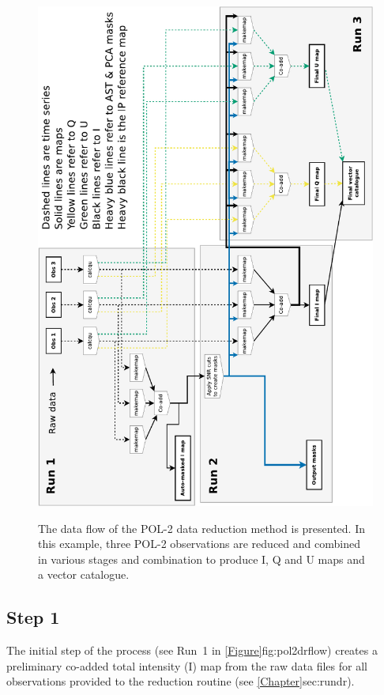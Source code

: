 \begin{figure}[t!]
\begin{center}
{\includegraphics[width=1.0\linewidth]{pol2map_flow}}
\caption [POL-2 Data Flow]{ The data flow of the POL-2 data reduction
  method is presented. In this example, three POL-2 observations are
  reduced and combined in various stages and combination to produce I,
  Q and U maps and a vector catalogue.  }
\label{fig:pol2drflow}
\end{center}
\end{figure}


\subsection*{Step 1}

The initial step of the process (see Run~1 in \cref{Figure}{fig:pol2drflow}{})
creates a preliminary co-added total intensity
(I) map from the raw data files for all observations provided to the
reduction routine (see \cref{Chapter}{sec:rundr}{}).


